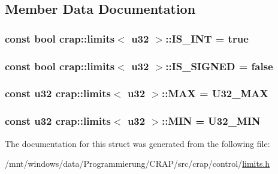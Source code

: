 \subsection{Member Data Documentation}
\hypertarget{structcrap_1_1limits_3_01u32_01_4_a61391851a0c427911b85d1f820749120}{
\subsubsection[{I\-S\-\_\-\-I\-N\-T}]{\setlength{\rightskip}{0pt plus 5cm}const bool {\bf crap\-::limits}$<$ {\bf u32} $>$\-::I\-S\-\_\-\-I\-N\-T = true\hspace{0.3cm}{\ttfamily [static]}}}\label{structcrap_1_1limits_3_01u32_01_4_a61391851a0c427911b85d1f820749120}
\hypertarget{structcrap_1_1limits_3_01u32_01_4_a4f3d08b60760db3e899e50e86f2c67b5}{
\subsubsection[{I\-S\-\_\-\-S\-I\-G\-N\-E\-D}]{\setlength{\rightskip}{0pt plus 5cm}const bool {\bf crap\-::limits}$<$ {\bf u32} $>$\-::I\-S\-\_\-\-S\-I\-G\-N\-E\-D = false\hspace{0.3cm}{\ttfamily [static]}}}\label{structcrap_1_1limits_3_01u32_01_4_a4f3d08b60760db3e899e50e86f2c67b5}
\hypertarget{structcrap_1_1limits_3_01u32_01_4_ab5ece5bb1f3672fc9eeb021079b0ea43}{
\subsubsection[{M\-A\-X}]{\setlength{\rightskip}{0pt plus 5cm}const {\bf u32} {\bf crap\-::limits}$<$ {\bf u32} $>$\-::M\-A\-X = {\bf U32\-\_\-\-M\-A\-X}\hspace{0.3cm}{\ttfamily [static]}}}\label{structcrap_1_1limits_3_01u32_01_4_ab5ece5bb1f3672fc9eeb021079b0ea43}
\hypertarget{structcrap_1_1limits_3_01u32_01_4_ae7af50ad2958496a562f706a503b29db}{
\subsubsection[{M\-I\-N}]{\setlength{\rightskip}{0pt plus 5cm}const {\bf u32} {\bf crap\-::limits}$<$ {\bf u32} $>$\-::M\-I\-N = {\bf U32\-\_\-\-M\-I\-N}\hspace{0.3cm}{\ttfamily [static]}}}\label{structcrap_1_1limits_3_01u32_01_4_ae7af50ad2958496a562f706a503b29db}


The documentation for this struct was generated from the following file\-:\begin{DoxyCompactItemize}
\item 
/mnt/windows/data/\-Programmierung/\-C\-R\-A\-P/src/crap/control/\hyperlink{limits_8h}{limits.\-h}\end{DoxyCompactItemize}
